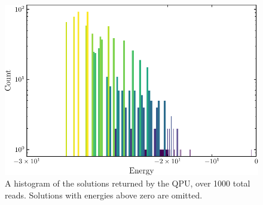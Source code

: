 \documentclass[aps,pra,10pt,twocolumn]{revtex4-2}
\begin{document}
\begin{figure}[h]
    \centering
    \includegraphics[width=\linewidth]{../Figures/histogram.pdf}
    \caption{A histogram of the solutions returned by the QPU, over 1000 total reads. Solutions with energies above zero are omitted.}
    \label{fig:histogram}
\end{figure}
\end{document}
